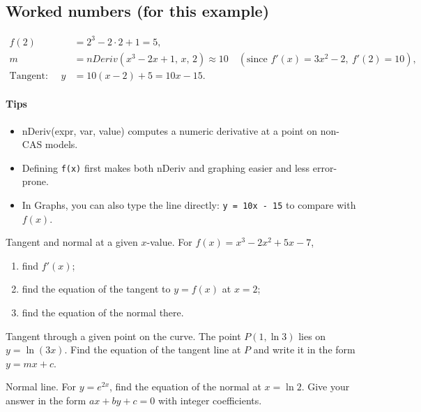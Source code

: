 \documentclass[11pt]{article}
\newcommand{\btn}[1]{\fbox{\sffamily\footnotesize #1}}
\newcommand{\menuarrow}{\,\textrightarrow\,}
\def\textbf#1{#1}%
\def\texttt#1{#1}%
\newcounter{question}
\begin{document}
\subsection*{Worked numbers (for this example)}
\[
\begin{aligned}
f(2) &= 2^3 - 2\cdot 2 + 1 = 5,\\
m &= \texttt{nDeriv}(x^3 - 2x + 1,\, x,\, 2) \approx 10 \quad(\text{since } f'(x)=3x^2-2,\ f'(2)=10),\\
\text{Tangent: }\quad y &= 10(x-2) + 5 = 10x - 15.
\end{aligned}
\]

\paragraph{Tips}
\begin{itemize}
  \item \texttt{nDeriv(expr, var, value)} computes a numeric derivative at a point on non-CAS models.
  \item Defining \verb|f(x)| first makes both \texttt{nDeriv} and graphing easier and less error-prone.
  \item In Graphs, you can also type the line directly: \verb|y = 10x - 15| to compare with \(f(x)\).
\end{itemize}

\providecommand{\btn}[1]{\fbox{\sffamily\footnotesize #1}}
\providecommand{\menuarrow}{\,\textrightarrow\,}

\begin{question}
\textbf{Tangent and normal at a given $x$-value.}
For $f(x)=x^3-2x^2+5x-7$,
\begin{enumerate}
  \item find $f'(x)$;
  \item find the equation of the tangent to $y=f(x)$ at $x=2$;
  \item find the equation of the normal there.
\end{enumerate}
\end{question}



\begin{question}
\textbf{Tangent through a given point on the curve.}
The point $P(1,\ln 3)$ lies on $y=\ln(3x)$. Find the equation of the tangent line at $P$ and write it in the form $y=mx+c$.
\end{question}

\begin{question}
\textbf{Normal line.}
For $y=e^{2x}$, find the equation of the normal at $x=\ln 2$. Give your answer in the form $ax+by+c=0$ with integer coefficients.
\end{question}
\end{document}
